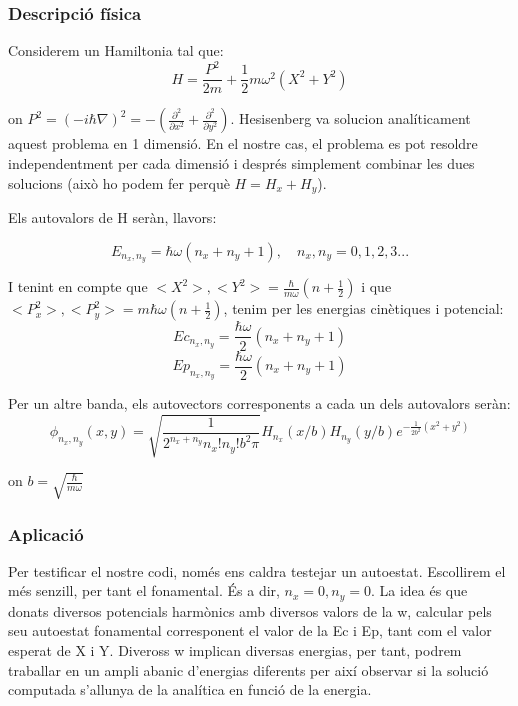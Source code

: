 \documentclass{article}
\begin{document}
\subsubsection{Descripció física}
Considerem un Hamiltonia tal que:
\begin{equation}
H=\frac{P^2}{2m}+\frac{1}{2}m\omega^2(X^2+Y^2)
\end{equation}

on \(P^2=(-i\hbar\nabla)^2=- (\frac{\partial^2}{\partial x^2}+\frac{\partial^2}{\partial y^2}) \). Hesisenberg va solucion analíticament aquest problema en 1 dimensió. En el nostre cas, el problema es pot resoldre independentment per cada dimensió i després simplement combinar les dues solucions (això ho podem fer perquè \(H=H_x+H_y\)).

Els autovalors de H seràn, llavors:

\begin{equation}
E_{n_x,n_y}=\hbar\omega(n_x+n_y +1 ), \quad n_x,n_y=0,1,2,3...
\end{equation}

I tenint en compte que \(<X^2>,<Y^2>=\frac{\hbar}{m\omega}(n+ \frac{1}{2})\) i que \(<P_x^2>,<P_y^2>=m\hbar\omega(n+ \frac{1}{2})\), tenim per les energias cinètiques i potencial:
\begin{equation}
Ec_{n_x,n_y}=\frac{\hbar\omega}{2}(n_x+n_y+1)
\end{equation}
\begin{equation}
Ep_{n_x,n_y}=\frac{\hbar\omega}{2}(n_x+n_y+1)
\end{equation}

Per un altre banda, els autovectors corresponents a cada un dels autovalors seràn:
\begin{equation}
\phi_{n_x,n_y}(x,y)=\sqrt{\frac{1}{2^{n_x+n_y}n_x!n_y!b^2\pi}}H_{n_x}(x/b)H_{n_y}(y/b)e^{-\frac{1}{2b^2}(x^2 +y^2)}
\end{equation}

on \(b=\sqrt{\frac{\hbar}{m\omega}}\)

\subsubsection{Aplicació}
Per testificar el nostre  codi, només ens caldra testejar un autoestat. Escollirem el més senzill, per tant el fonamental. És a dir, \(n_x=0,n_y=0\).
La idea és que donats diversos potencials harmònics amb diversos valors de la w, calcular pels seu autoestat fonamental corresponent el valor de la Ec
i Ep, tant com el valor esperat de X i Y. Diveross w implican diversas energias, per tant, podrem traballar en un ampli abanic d'energias diferents 
per així observar si la solució computada s'allunya de la analítica en funció de la energia.
\end{document}
